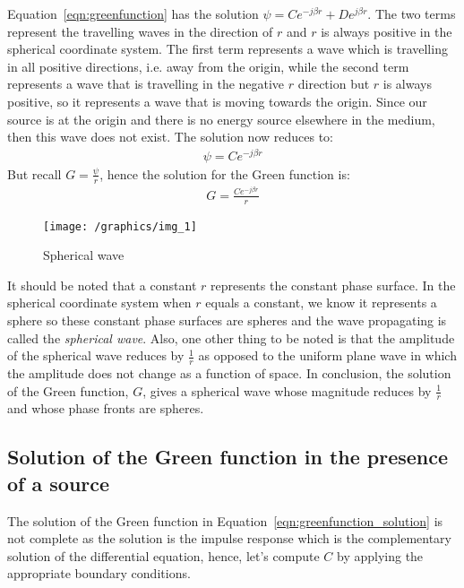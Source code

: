 Equation~\eqref{eqn:greenfunction} has the solution $\psi = Ce^{-j\beta r} + De^{j\beta r}$. The two terms represent the travelling waves in the direction of $r$ and $r$ is always positive in the spherical coordinate system. The first term represents a wave which is travelling in all positive directions, i.e. away from the origin, while the second term represents a wave that is travelling in the negative $r$ direction but $r$ is always positive, so it represents a wave that is moving towards the origin. Since our source is at the origin and there is no energy source elsewhere in the medium, then this wave does not exist. The solution now reduces to:
\begin{align*}
\psi = Ce^{-j\beta r}
\end{align*}
But recall $G = \frac{\psi}{r}$, hence the solution for the Green function is:
\begin{align}
G = \frac{Ce^{-j\beta r}}{r}
\label{eqn:greenfunction_solution}
\end{align}
\begin{figure}[h]
\centering
\texttt{[image: /graphics/img\_1]}
\caption{Spherical wave}
\label{fig:sphericalwave}
\end{figure}

It should be noted that a constant $r$ represents the constant phase surface. In the spherical coordinate system when $r$ equals a constant, we know it represents a sphere so these constant phase surfaces are spheres and the wave propagating is called the \emph{spherical wave}. Also, one other thing to be noted is that the amplitude of the spherical wave reduces by $\frac{1}{r}$ as opposed to the uniform plane wave in which the amplitude does not change as a function of space. In conclusion, the solution of the Green function, $G$, gives a spherical wave whose magnitude reduces by  $\frac{1}{r}$ and whose phase fronts are spheres.

\subsection{Solution of the Green function in the presence of a source}
The solution of the Green function in Equation~\eqref{eqn:greenfunction_solution} is not complete as the solution is the impulse response which is the complementary solution of the differential equation, hence, let's compute $C$ by applying the appropriate boundary conditions.

